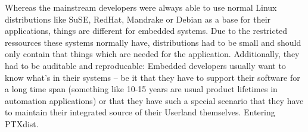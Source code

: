 Whereas the mainstream developers were always able to use normal Linux
distributions like SuSE, RedHat, Mandrake or Debian as a base for their
applications, things are different for embedded systems. Due to the
restricted ressources these systems normally have, distributions had to
be small and should only contain that things which are needed for the
application. Additionally, they had to be auditable and reproducable:
Embedded developers usually want to know what's in their systems -- be
it that they have to support their software for a long time span
(something like 10-15 years are usual product lifetimes in automation
applications) or that they have such a special scenario that they have
to maintain their integrated source of their Userland themselves.
Entering PTXdist. 
